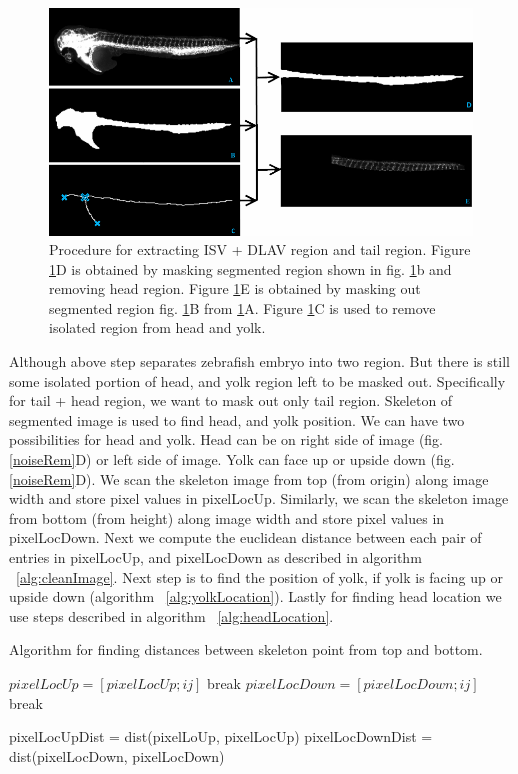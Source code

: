 \begin{figure}[htb] 
\centering
    \includegraphics[scale=0.65]{figure/isvCvpRegion.png}  
  \caption[ROI Detection]{Procedure for extracting ISV + DLAV region and tail region. Figure \ref{region}D is obtained by masking segmented region shown in fig. \ref{region}b and removing head region. Figure \ref{region}E is obtained by masking out segmented region fig. \ref{region}B from \ref{region}A. Figure \ref{region}C is used to remove isolated region from head and yolk.}
  \label{region}
\end{figure}

Although above step separates zebrafish embryo into two region. But there is still some isolated portion of head, and yolk region left to be masked out. Specifically for tail + head region, we want to mask out only tail region. Skeleton of segmented image is used to find head, and yolk position. We can have two possibilities for head and yolk. Head can be on right side of image (fig. \ref{noiseRem}D) or left side of image. Yolk can face up or upside down (fig. \ref{noiseRem}D). We scan the skeleton image from top (from origin) along image width and store pixel values in pixelLocUp. Similarly, we scan the skeleton image from bottom (from height) along image width and store pixel values in pixelLocDown. Next we compute the euclidean distance between each pair of entries in pixelLocUp, and pixelLocDown as described in algorithm ~\ref{alg:cleanImage}. Next step is to find the position of yolk, if yolk is facing up or upside down (algorithm ~\ref{alg:yolkLocation}). Lastly for finding head location we use steps described in algorithm ~\ref{alg:headLocation}.

\begin{algorithm}
  \caption{Algorithm for finding distances between skeleton point from top and bottom.}
  \begin{algorithmic}
			 \State  $pixelLocUp = [pixelLocUp; i j]$
			\State break
    \EndIf  
	\EndFor
	\EndFor
			\State  $pixelLocDown = [pixelLocDown; i  j]$
			\State break
  \EndIf  
	\EndFor
	\EndFor
		
 \State pixelLocUpDist = dist(pixelLoUp, pixelLocUp)
 \State pixelLocDownDist = dist(pixelLocDown, pixelLocDown)
\end{algorithmic}
\label{alg:cleanImage}
\end{algorithm}

